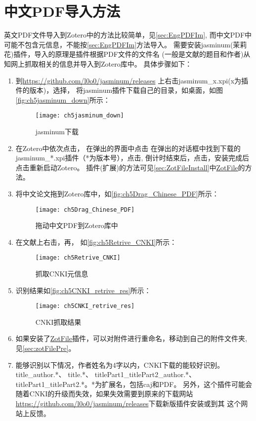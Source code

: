 \documentclass[cn,11pt,chinese]{elegantbook}
\begin{document}
		\section{中文PDF导入方法}\label{sec:Chinese_PDF}
			英文PDF文件导入到Zotero中的方法比较简单，见\cref{sec:EngPDFIm},
			而中文PDF中可能不包含元信息，不能按\cref{sec:EngPDFIm}方法导入。
			需要安装jasminum(茉莉花)插件，导入的原理是插件根据PDF文件的文件名
			(一般是文献的题目和作者)从知网上抓取相关的信息并导入到Zotero库中。
			具体步骤如下：
			\begin{enumerate}
				\item 到\url{https://github.com/l0o0/jasminum/releases}
				上右击jasminum\_x.xpi(x为插件的版本)，选择，
				将jasminum插件下载自己的目录，如桌面，如图\autoref{fig:ch5jasminum_down}所示：
	    		\begin{figure}[ht]
					\centering
					\texttt{[image: ch5jasminum\_down]}
					\caption{jasminum下载}
					\label{fig:ch5jasminum_down}
	    		\end{figure}
				\item 在Zotero中依次点击，
				在弹出的界面中点击
				在弹出的对话框中找到下载的jasminum\_*.xpi插件（*为版本号），点击,
				倒计时结束后，点击，安装完成后点击重新启动Zotero。
				插件(扩展)的方法可见\cref{sec:ZotFileInstall}中\href{http://zotfile.com/}{ZotFile}的方法。
				\item 将中文论文拖到Zotero库中，如\autoref{fig:ch5Drag_Chinese_PDF}所示：
					\begin{figure}[ht]
						\centering
						\texttt{[image: ch5Drag\_Chinese\_PDF]}
						\caption{拖动中文PDF到Zotero库中}
						\label{fig:ch5Drag_Chinese_PDF}
					\end{figure}
				\item 在文献上右击，再，
				如\autoref{fig:ch5Retrive_CNKI}所示：
					\begin{figure}[ht]
						\centering
						\texttt{[image: ch5Retrive\_CNKI]}
						\caption{抓取CNKI元信息}
						\label{fig:ch5Retrive_CNKI}
					\end{figure}
				\item 识别结果如\autoref{fig:ch5CNKI_retrive_res}所示：
					\begin{figure}[ht]
						\centering
						\texttt{[image: ch5CNKI\_retrive\_res]}
						\caption{CNKI抓取结果}
						\label{fig:ch5CNKI_retrive_res}
					\end{figure}
				\item 如果安装了\href{http://zotfile.com/}{ZotFile}插件，可以对附件进行重命名，移动到自己的附件文件夹,
				见\cref{sec:zotFilePre}。
				\item 能够识别以下情况，作者姓名为4字以内，CNKI下载的能较好识别。
				title\_author.*、
				title.*、
				titlePart1\_titlePart2\_author.*、
				titlePart1\_titlePart2.*。*为扩展名，包括caj和PDF。
				另外，这个插件可能会随着CNKI的升级而失效，如果失效需要到原来的下载网站
				\url{https://github.com/l0o0/jasminum/releases}下载新版插件安装或到其
				这个网站上反馈。



\end{enumerate}
\end{document}
